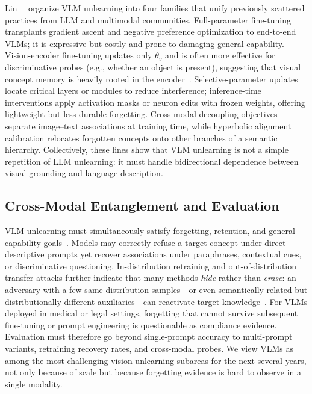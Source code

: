 \documentclass[10pt,twocolumn,letterpaper]{article}
\begin{document}
Lin~\etal~\cite{lin2026vlm} organize VLM unlearning into four families that unify previously scattered practices from LLM and multimodal communities. Full-parameter fine-tuning transplants gradient ascent and negative preference optimization to end-to-end VLMs; it is expressive but costly and prone to damaging general capability. Vision-encoder fine-tuning updates only $\theta_v$ and is often more effective for discriminative probes (e.g., whether an object is present), suggesting that visual concept memory is heavily rooted in the encoder~\cite{lin2026vlm}. Selective-parameter updates locate critical layers or modules to reduce interference; inference-time interventions apply activation masks or neuron edits with frozen weights, offering lightweight but less durable forgetting. Cross-modal decoupling objectives separate image--text associations at training time, while hyperbolic alignment calibration relocates forgotten concepts onto other branches of a semantic hierarchy. Collectively, these lines show that VLM unlearning is not a simple repetition of LLM unlearning: it must handle bidirectional dependence between visual grounding and language description.

\subsection{Cross-Modal Entanglement and Evaluation}

VLM unlearning must simultaneously satisfy forgetting, retention, and general-capability goals~\cite{lin2026vlm}. Models may correctly refuse a target concept under direct descriptive prompts yet recover associations under paraphrases, contextual cues, or discriminative questioning. In-distribution retraining and out-of-distribution transfer attacks further indicate that many methods \emph{hide} rather than \emph{erase}: an adversary with a few same-distribution samples---or even semantically related but distributionally different auxiliaries---can reactivate target knowledge~\cite{lin2026vlm}. For VLMs deployed in medical or legal settings, forgetting that cannot survive subsequent fine-tuning or prompt engineering is questionable as compliance evidence. Evaluation must therefore go beyond single-prompt accuracy to multi-prompt variants, retraining recovery rates, and cross-modal probes. We view VLMs as among the most challenging vision-unlearning subareas for the next several years, not only because of scale but because forgetting evidence is hard to observe in a single modality.
\end{document}
